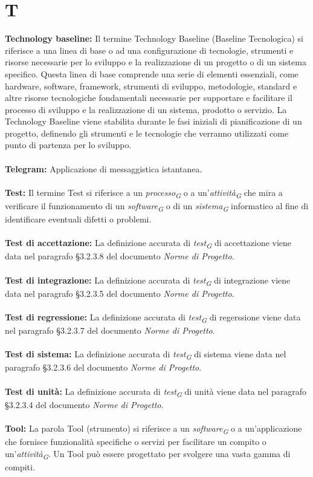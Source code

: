 \documentclass{article}
\begin{document}
\section*{T}
{}
\textbf{Technology baseline:} Il termine Technology Baseline (Baseline Tecnologica) si riferisce a una linea di base o ad una configurazione di tecnologie, strumenti e risorse necessarie per lo sviluppo e la realizzazione di un progetto o di un sistema specifico. Questa linea di base comprende una serie di elementi essenziali, come hardware, software, framework, strumenti di sviluppo, metodologie, standard e altre risorse tecnologiche fondamentali necessarie per supportare e facilitare il processo di sviluppo e la realizzazione di un sistema, prodotto o servizio. La Technology Baseline viene stabilita durante le fasi iniziali di pianificazione di un progetto, definendo gli strumenti e le tecnologie che verranno utilizzati come punto di partenza per lo sviluppo.
\\
\\
\textbf{Telegram:} Applicazione di messaggistica istantanea.
\\
\\
\textbf{Test:} Il termine Test si riferisce a un \textit{processo}\textsubscript{\textit{G}} o a un'\textit{attività}\textsubscript{\textit{G}} che mira a verificare il funzionamento di un \textit{software}\textsubscript{\textit{G}} o di un \textit{sistema}\textsubscript{\textit{G}} informatico al fine di identificare eventuali difetti o problemi.
\\
\\
\textbf{Test di accettazione:} La definizione accurata di \textit{test}\textsubscript{\textit{G}} di accettazione viene data nel paragrafo §3.2.3.8 del documento \textit{Norme di Progetto}.
\\
\\
\textbf{Test di integrazione:}  La definizione accurata di \textit{test}\textsubscript{\textit{G}} di integrazione viene data nel paragrafo §3.2.3.5 del documento \textit{Norme di Progetto}.
\\
\\
\textbf{Test di regressione:}  La definizione accurata di \textit{test}\textsubscript{\textit{G}} di regerssione viene data nel paragrafo §3.2.3.7 del documento \textit{Norme di Progetto}.
\\
\\
\textbf{Test di sistema:}  La definizione accurata di \textit{test}\textsubscript{\textit{G}} di sistema viene data nel paragrafo §3.2.3.6 del documento \textit{Norme di Progetto}.
\\
\\
\textbf{Test di unità:}  La definizione accurata di \textit{test}\textsubscript{\textit{G}} di unità viene data nel paragrafo §3.2.3.4 del documento \textit{Norme di Progetto}.
\\
\\
\textbf{Tool:} La parola Tool (strumento) si riferisce a un \textit{software}\textsubscript{\textit{G}} o a un'applicazione che fornisce funzionalità specifiche o servizi per facilitare un compito o un'\textit{attività}\textsubscript{\textit{G}}. Un Tool può essere progettato per svolgere una vasta gamma di compiti.
\pagebreak
\end{document}
